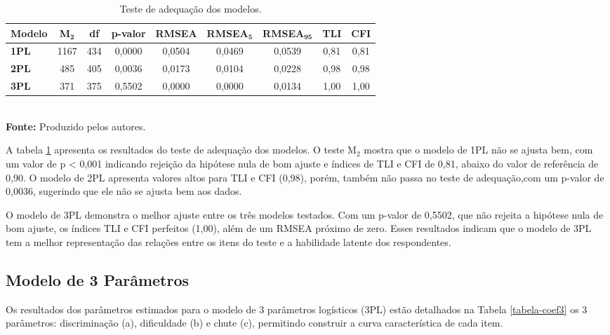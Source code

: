 \begin{table}[!htb]
	 \centering
		\caption{Teste de adequação dos modelos. }
		\label{tabela-m2}
		\begin{tabular}{lcccccccc}
			\hline
			\textbf{Modelo} & \textbf{M}$_\textbf{2}$ & \textbf{df} &\textbf{ p-valor} & \textbf{RMSEA} & \textbf{RMSEA$_\textbf{5}$} & \textbf{RMSEA$_{\textbf{95}}$} & \textbf{TLI} & \textbf{CFI} \\ 
			\hline 
		\textbf{1PL} & 1167 & 434 & 0,0000 & 0,0504 & 0,0469 & 0,0539 & 0,81 & 0,81 \\ 
		\hline
		\textbf{2PL} & 485 & 405 & 0,0036 & 0,0173 & 0,0104 & 0,0228 & 0,98 & 0,98 \\ 
		\hline
		\textbf{3PL} & 371 & 375 & 0,5502 & 0,0000 & 0,0000 & 0,0134 & 1,00 & 1,00 \\ 
			\hline
		\end{tabular}\\
		\vspace*{0.5cm}
		\small{\textbf{Fonte:} Produzido pelos autores.}
\end{table}


A tabela \ref{tabela-m2} apresenta os resultados do teste de adequação dos modelos. O teste M$_2$ mostra que o modelo de 1PL não se ajusta bem, com um valor de p < 0,001 indicando rejeição da hipótese nula de bom ajuste e índices de TLI e CFI de 0,81, abaixo do valor de referência de 0,90. O modelo de 2PL apresenta valores altos para TLI e CFI (0,98), porém, também não passa no teste de adequação,com um p-valor de 0,0036, sugerindo que ele não se ajusta bem aos dados.

O modelo de 3PL demonstra o melhor ajuste entre os três modelos testados. Com um p-valor de 0,5502, que não rejeita a hipótese nula de bom ajuste, os índices TLI e CFI perfeitos (1,00), além de um RMSEA próximo de zero. Esses resultados indicam que o modelo de 3PL tem a melhor representação das relações entre os itens do teste e a habilidade latente dos respondentes.


\subsection{Modelo de 3 Parâmetros}

Os resultados dos parâmetros estimados para o modelo de 3 parâmetros logísticos (3PL) estão detalhados na Tabela \ref{tabela-coef3} os 3 parâmetros: discriminação (a), dificuldade (b) e chute (c), permitindo construir a curva característica de cada item. 

